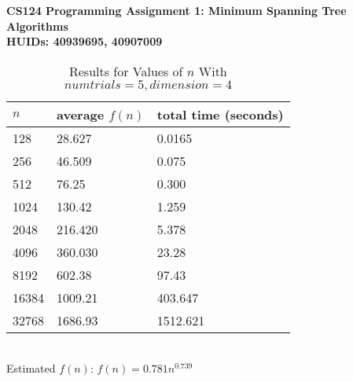 \documentclass[11pt]{article}
\begin{document}
\textbf{CS124 Programming Assignment 1: Minimum Spanning Tree Algorithms\\
	HUIDs: 40939695, 40907009}
	\begin{table}[h]
		\centering
		\caption{Results for Values of $n$ With $numtrials = 5, dimension = 4$}
		\begin{tabular}{lll}
			$n$                         & average $f(n)$                        & total time (seconds)                        \\ \hline
			\multicolumn{1}{|l|}{128} & \multicolumn{1}{l|}{28.627} & \multicolumn{1}{l|}{0.0165} \\ \hline
			\multicolumn{1}{|l|}{256}    & \multicolumn{1}{l|}{46.509}       & \multicolumn{1}{l|}{0.075}       \\ \hline
			\multicolumn{1}{|l|}{512}    & \multicolumn{1}{l|}{76.25}       & \multicolumn{1}{l|}{0.300}       \\ \hline
			\multicolumn{1}{|l|}{1024}    & \multicolumn{1}{l|}{130.42}       & \multicolumn{1}{l|}{1.259}       \\ \hline
			\multicolumn{1}{|l|}{2048}    & \multicolumn{1}{l|}{216.420}       & \multicolumn{1}{l|}{5.378}       \\ \hline
			\multicolumn{1}{|l|}{4096}    & \multicolumn{1}{l|}{360.030}       & \multicolumn{1}{l|}{23.28}       \\ \hline
			\multicolumn{1}{|l|}{8192}    & \multicolumn{1}{l|}{602.38}       & \multicolumn{1}{l|}{97.43}       \\ \hline
			\multicolumn{1}{|l|}{16384}    & \multicolumn{1}{l|}{1009.21}       & \multicolumn{1}{l|}{403.647}       \\ \hline
			\multicolumn{1}{|l|}{32768}    & \multicolumn{1}{l|}{1686.93}       & \multicolumn{1}{l|}{1512.621}       \\ \hline
		\end{tabular}
	\end{table}\\
	Estimated $f(n)$: $f(n) = 0.781n^{0.739}$
	
\end{document}

